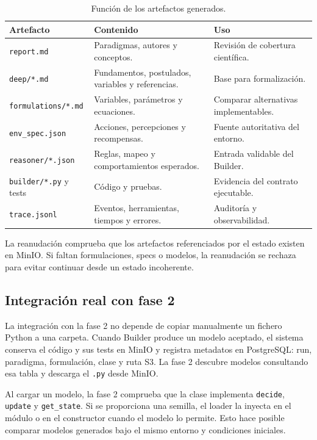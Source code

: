 \begin{table}[H]
\begin{center}
\small
\begin{tabular}{|p{3.6cm}|p{4.3cm}|p{4.6cm}|} \hline
\textbf{Artefacto} & \textbf{Contenido} & \textbf{Uso} \\ \hline
\texttt{report.md} & Paradigmas, autores y conceptos. & Revisión de cobertura científica. \\ \hline
\texttt{deep/*.md} & Fundamentos, postulados, variables y referencias. & Base para formalización. \\ \hline
\texttt{formulations/*.md} & Variables, parámetros y ecuaciones. & Comparar alternativas implementables. \\ \hline
\texttt{env\_spec.json} & Acciones, percepciones y recompensas. & Fuente autoritativa del entorno. \\ \hline
\texttt{reasoner/*.json} & Reglas, mapeo y comportamientos esperados. & Entrada validable del Builder. \\ \hline
\texttt{builder/*.py} y tests & Código y pruebas. & Evidencia del contrato ejecutable. \\ \hline
\texttt{trace.jsonl} & Eventos, herramientas, tiempos y errores. & Auditoría y observabilidad. \\ \hline
\end{tabular}
\caption{Función de los artefactos generados.}
\end{center}
\end{table}

La reanudación comprueba que los artefactos referenciados por el estado existen
en MinIO. Si faltan formulaciones, specs o modelos, la reanudación se rechaza
para evitar continuar desde un estado incoherente.

\subsection{Integración real con fase 2}
\label{ap:integracion-fase2}

La integración con la fase 2 no depende de copiar manualmente un fichero Python
a una carpeta. Cuando Builder produce un modelo aceptado, el sistema conserva
el código y sus tests en MinIO y registra metadatos en PostgreSQL: run,
paradigma, formulación, clase y ruta S3. La fase 2 descubre modelos consultando
esa tabla y descarga el \texttt{.py} desde MinIO.

Al cargar un modelo, la fase 2 comprueba que la clase implementa
\texttt{decide}, \texttt{update} y \texttt{get\_state}. Si se proporciona una
semilla, el loader la inyecta en el módulo o en el constructor cuando el modelo
lo permite. Esto hace posible comparar modelos generados bajo el mismo entorno
y condiciones iniciales.

